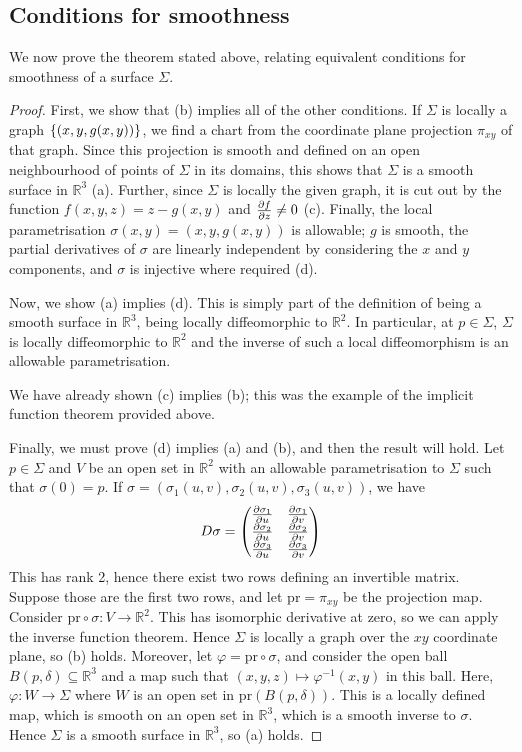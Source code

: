 \subsection{Conditions for smoothness}
We now prove the theorem stated above, relating equivalent conditions for smoothness of a surface \( \Sigma \).
\begin{proof}
	First, we show that (b) implies all of the other conditions.
	If \( \Sigma \) is locally a graph \( \qty{(x,y,g(x,y))} \), we find a chart from the coordinate plane projection \( \pi_{xy} \) of that graph.
	Since this projection is smooth and defined on an open neighbourhood of points of \( \Sigma \) in its domains, this shows that \( \Sigma \) is a smooth surface in \( \mathbb R^3 \) (a).
	Further, since \( \Sigma \) is locally the given graph, it is cut out by the function \( f(x,y,z) = z - g(x,y) \) and \( \pdv{f}{z} \neq 0 \) (c).
	Finally, the local parametrisation \( \sigma(x,y) = (x,y,g(x,y)) \) is allowable; \( g \) is smooth, the partial derivatives of \( \sigma \) are linearly independent by considering the \( x \) and \( y \) components, and \( \sigma \) is injective where required (d).

	Now, we show (a) implies (d).
	This is simply part of the definition of being a smooth surface in \( \mathbb R^3 \), being locally diffeomorphic to \( \mathbb R^2 \).
	In particular, at \( p \in \Sigma \), \( \Sigma \) is locally diffeomorphic to \( \mathbb R^2 \) and the inverse of such a local diffeomorphism is an allowable parametrisation.

	We have already shown (c) implies (b); this was the example of the implicit function theorem provided above.

	Finally, we must prove (d) implies (a) and (b), and then the result will hold.
	Let \( p \in \Sigma \) and \( V \) be an open set in \( \mathbb R^2 \) with an allowable parametrisation to \( \Sigma \) such that \( \sigma(0) = p \).
	If \( \sigma = (\sigma_1(u,v), \sigma_2(u,v), \sigma_3(u,v)) \), we have
	\[
		D\sigma = \begin{pmatrix}
			\pdv{\sigma_1}{u} & \pdv{\sigma_1}{v} \\
			\pdv{\sigma_2}{u} & \pdv{\sigma_2}{v} \\
			\pdv{\sigma_3}{u} & \pdv{\sigma_3}{v}
		\end{pmatrix}
	\]
	This has rank 2, hence there exist two rows defining an invertible matrix.
	Suppose those are the first two rows, and let \( \mathrm{pr} = \pi_{xy} \) be the projection map.
	Consider \( \mathrm{pr} \circ \sigma \colon V \to \mathbb R^2 \).
	This has isomorphic derivative at zero, so we can apply the inverse function theorem.
	Hence \( \Sigma \) is locally a graph over the \( xy \) coordinate plane, so (b) holds.
	Moreover, let \( \varphi = \mathrm{pr} \circ \sigma \), and consider the open ball \( B(p, \delta) \subseteq \mathbb R^3 \) and a map such that \( (x,y,z) \mapsto \varphi^{-1}(x,y) \) in this ball.
	Here, \( \varphi \colon W \to \Sigma \) where \( W \) is an open set in \( \mathrm{pr}(B(p, \delta)) \).
	This is a locally defined map, which is smooth on an open set in \( \mathbb R^3 \), which is a smooth inverse to \( \sigma \).
	Hence \( \Sigma \) is a smooth surface in \( \mathbb R^3 \), so (a) holds.
\end{proof}
